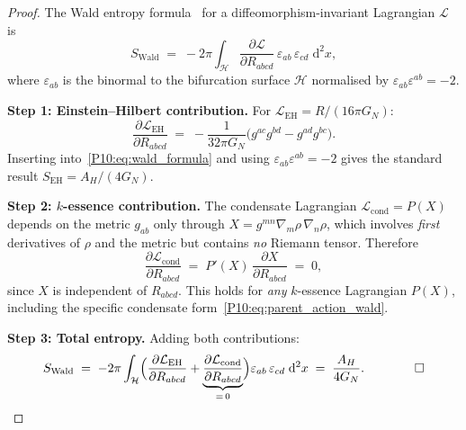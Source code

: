 \documentclass[11pt,a4paper]{article}
\theoremstyle{definition}
\theoremstyle{remark}
\begin{document}
\begin{proof}
The Wald entropy formula~\cite{Wald1993} for a diffeomorphism-invariant
Lagrangian $\mathcal{L}$ is
\begin{equation}
  S_\mathrm{Wald}
  \;=\; -2\pi\int_{\mathcal{H}}
  \frac{\partial\mathcal{L}}{\partial R_{abcd}}\,
  \varepsilon_{ab}\,\varepsilon_{cd}\;\mathrm{d}^2x,
  \label{P10:eq:wald_formula}
\end{equation}
where $\varepsilon_{ab}$ is the binormal to the bifurcation surface
$\mathcal{H}$ normalised by $\varepsilon_{ab}\varepsilon^{ab}=-2$.

\textbf{Step 1: Einstein--Hilbert contribution.}
For $\mathcal{L}_\mathrm{EH} = R/(16\pi G_N)$:
\begin{equation}
  \frac{\partial\mathcal{L}_\mathrm{EH}}{\partial R_{abcd}}
  \;=\; -\frac{1}{32\pi G_N}
  \bigl(g^{ac}g^{bd} - g^{ad}g^{bc}\bigr).
  \label{P10:eq:dLEH}
\end{equation}
Inserting into~\eqref{P10:eq:wald_formula} and using
$\varepsilon_{ab}\varepsilon^{ab}=-2$ gives the standard result
$S_\mathrm{EH} = A_H/(4G_N)$.

\textbf{Step 2: $k$-essence contribution.}
The condensate Lagrangian $\mathcal{L}_\mathrm{cond} = P(X)$ depends
on the metric $g_{ab}$ only through
$X = g^{mn}\nabla_{\!m}\rho\,\nabla_{\!n}\rho$, which involves
\emph{first} derivatives of $\rho$ and the metric but contains
\emph{no} Riemann tensor.
Therefore
\begin{equation}
  \frac{\partial\mathcal{L}_\mathrm{cond}}{\partial R_{abcd}}
  \;=\; P'(X)\,\frac{\partial X}{\partial R_{abcd}}
  \;=\; 0,
  \label{P10:eq:dLcond}
\end{equation}
since $X$ is independent of $R_{abcd}$.
This holds for \emph{any} $k$-essence Lagrangian $P(X)$,
including the specific condensate form~\eqref{P10:eq:parent_action_wald}.

\textbf{Step 3: Total entropy.}
Adding both contributions:
\begin{equation}
  S_\mathrm{Wald}
  \;=\; -2\pi\int_{\mathcal{H}}
  \Bigl(\frac{\partial\mathcal{L}_\mathrm{EH}}{\partial R_{abcd}}
  + \underbrace{\frac{\partial\mathcal{L}_\mathrm{cond}}{\partial R_{abcd}}}_{=\,0}\Bigr)
  \varepsilon_{ab}\,\varepsilon_{cd}\;\mathrm{d}^2x
  \;=\; \frac{A_H}{4G_N}.\qquad\qed
\end{equation}
\end{proof}
\end{document}
